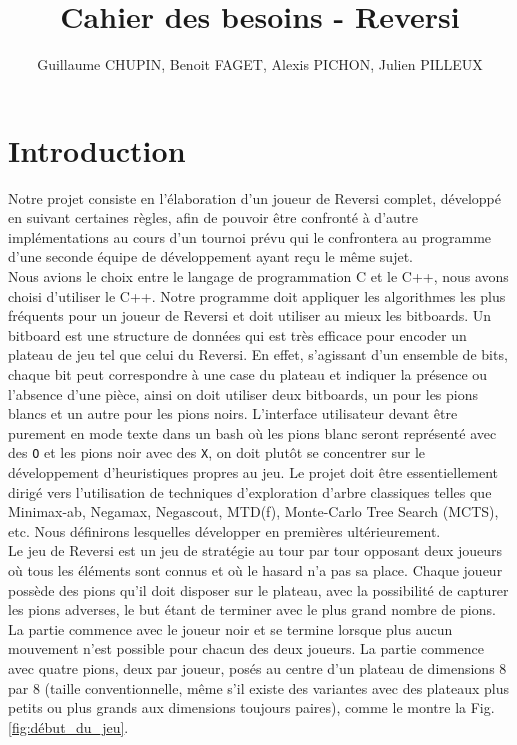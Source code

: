 \documentclass[10pt,a4paper]{article}
\title{Cahier des besoins - Reversi}
\author{Guillaume CHUPIN, Benoit FAGET, Alexis PICHON, Julien PILLEUX}
\begin{document}
\maketitle
\newpage
\tableofcontents
\newpage

\section{Introduction}

Notre projet consiste en l'élaboration d'un joueur de Reversi complet, développé en suivant certaines règles, afin de pouvoir être confronté à d'autre implémentations au cours d'un tournoi prévu qui le confrontera au programme d'une seconde équipe de développement ayant reçu le même sujet.\\

Nous avions le choix entre le langage de programmation C et le C++, nous avons choisi d'utiliser le C++. Notre programme doit appliquer les algorithmes les plus fréquents pour un joueur de Reversi et doit utiliser au mieux les bitboards. Un bitboard est une structure de données qui est très efficace pour encoder un plateau de jeu tel que celui du Reversi. En effet, s'agissant d'un ensemble de bits, chaque bit peut correspondre à une case du plateau et indiquer la présence ou l'absence d'une pièce, ainsi on doit utiliser deux bitboards, un pour les pions blancs et un autre pour les pions noirs. L'interface utilisateur devant être purement en mode texte dans un bash où les pions blanc seront représenté avec des \verb!O! et les pions noir avec des \verb!X!, on doit plutôt se concentrer sur le développement d'heuristiques propres au jeu. Le projet doit être essentiellement dirigé vers l'utilisation de techniques d'exploration d'arbre classiques telles que Minimax-ab, Negamax, Negascout, MTD(f), Monte-Carlo Tree Search (MCTS), etc. Nous définirons lesquelles développer en premières ultérieurement.\\

Le jeu de Reversi est un jeu de stratégie au tour par tour opposant deux joueurs où tous les éléments sont connus et où le hasard n'a pas sa place. Chaque joueur possède des pions qu'il doit disposer sur le plateau, avec la possibilité de capturer les pions adverses, le but étant de terminer avec le plus grand nombre de pions. La partie commence avec le joueur noir et se termine lorsque plus aucun mouvement n'est possible pour chacun des deux joueurs. La partie commence avec quatre pions, deux par joueur, posés au centre d'un plateau de dimensions 8 par 8 (taille conventionnelle, même s'il existe des variantes avec des plateaux plus petits ou plus grands aux dimensions toujours paires), comme le montre la Fig. \ref{fig:début_du_jeu}.
\end{document}
